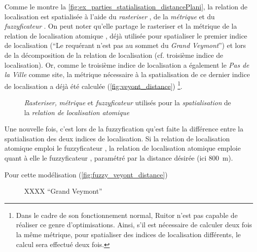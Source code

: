 Comme le montre la
\autoref{fig:ex_parties_statialisation_distancePlani}, la relation de
localisation  est
spatialisée à l'aide du \emph{rasteriser} , de
la \emph{métrique}  et du
\emph{fuzzyficateur} . On peut noter qu'elle
partage le rasteriser et la métrique de la relation de localisation
atomique , déjà utilisée pour
spatialiser le premier indice de localisation (\enquote{Le requérant
  n'est pas au sommet du \emph{Grand Veymont}}) et lors de la
décomposition de la relation de localisation
 (cf. troisième indice de
localisation). Or, comme le troisième indice de localisation a
également le \emph{Pas de la Ville} comme site, la métrique nécessaire
à la spatialisation de ce dernier indice de localisation a déjà été
calculée (\autoref{fig:veyont_distance}) \footnote{Dans le cadre de
  son fonctionnement normal, Ruitor n'est pas capable de réaliser ce
  genre d'optimisations. Ainsi, s'il est nécessaire de calculer deux
  fois la même métrique, pour spatialiser des indices de localisation
  différents, le calcul sera effectué deux fois.}.

\begin{figure}
  \centering
  
  \caption{\emph{Rasteriser,} \emph{métrique} et \emph{fuzzyficateur}
    utilisés pour la \emph{spatialisation} de la \emph{relation de
      localisation atomique}
    \protect{}}
  \label{fig:ex_parties_statialisation_distancePlani}
\end{figure}

Une nouvelle fois, c'est lors de la fuzzyfication qu'est faite la
différence entre la spatialisation des deux indices de
localisation. Si la relation de localisation atomique
 emploi le fuzzyficateur
, la relation de localisation atomique
 emploie quant à
elle le fuzzyficateur , paramétré par la distance
désirée (ici \SI{800}{\meter}).

Pour cette modélisation (\autoref{fig:fuzzy_veyont_distance})

\begin{figure}
  \centering
  
  \caption{XXXX \enquote{Grand Veymont}}
  \label{fig:fuzzy_veyont_distance}
\end{figure}


